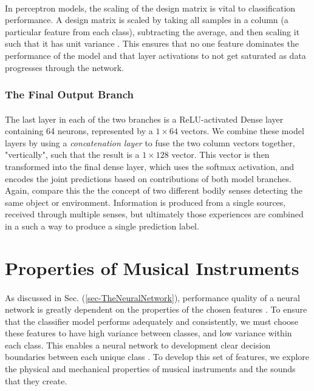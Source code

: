 \documentclass[12pt,letterpaper]{article}
\begin{document}
\paragraph*{}In perceptron models, the scaling of the design matrix is vital to classification performance. A design matrix is scaled by taking all samples in a column (a particular feature from each class), subtracting the average, and then scaling it such that it has unit variance \cite{Geron,James}. This ensures that no one feature dominates the performance of the model and that layer activations to not get saturated as data progresses through the network.


\subsubsection{The Final Output Branch}

\paragraph*{}The last layer in each of the two branches is a ReLU-activated Dense layer containing 64 neurons, represented by a $1 \times 64$ vectors. We combine these model layers by using a \textit{concatenation layer} to fuse the two column vectors together, "vertically", such that the result is a $1 \times 128$ vector. This vector is then transformed into the final dense layer, which uses the softmax activation, and encodes the joint predictions based on contributions of both model branches. Again, compare this the the concept of two different bodily senses detecting the same object or environment. Information is produced from a single sources, received through multiple senses, but ultimately those experiences are combined in a such a way to produce a single prediction label.


\newpage
\section{Properties of Musical Instruments}
\label{sec-Instruments}

\paragraph*{}As discussed in Sec. (\ref{sec-TheNeuralNetwork}), performance quality of a neural network is greatly dependent on the properties of the chosen features \cite{Virtanen,Liu}. To ensure that the classifier model performs adequately and consistently, we must choose these features to have high variance between classes, and low variance within each class. This enables a neural network to development clear decision boundaries between each unique class \cite{James,Serizel}. To develop this set of features, we explore the physical and mechanical properties of musical instruments and the sounds that they create.
\end{document}
